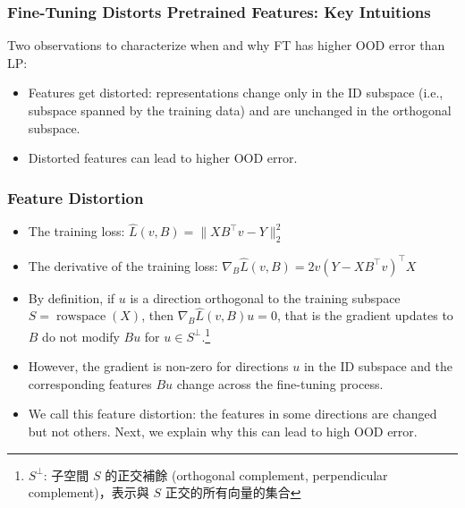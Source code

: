 \documentclass[16pt,aspectratio=169]{beamer}
\begin{document}
\begin{frame}
    \frametitle{Fine-Tuning Distorts Pretrained Features: Key Intuitions}

    Two observations to characterize when and why FT has higher OOD error than LP:

    \begin{itemize}
        \item Features get distorted: representations change only in the ID subspace (i.e., subspace spanned by the training data) and are unchanged in the orthogonal subspace.
        \item Distorted features can lead to higher OOD error.
    \end{itemize}
    
\end{frame}

\begin{frame}
    \frametitle{Feature Distortion}

    \begin{itemize}
        
        \item The training loss: $\widehat{L}(v, B) = \| XB^\top v - Y \|_2^2$
        \item The derivative of the training loss: $\nabla_B \widehat{L}(v, B) = 2v (Y-XB^\top v)^\top X$
        \item By definition, if $u$ is a direction orthogonal to the training subspace $S = \operatorname{rowspace}(X)$, then $\nabla_B \widehat{L}(v, B) u = 0$, that is the gradient updates to $B$ do not modify $Bu$ for $u \in S^\bot$.\footnote{$S^\perp$: 子空間 $S$ 的正交補餘 (orthogonal complement, perpendicular complement)，表示與 $S$ 正交的所有向量的集合}
        \item However, the gradient is non-zero for directions $u$ in the ID subspace and the corresponding features $Bu$ change across the fine-tuning process.
        \item We call this feature distortion: the features in some directions are changed but not others. Next, we explain why this can lead to high OOD error.
    \end{itemize}

\end{frame}
\end{document}
